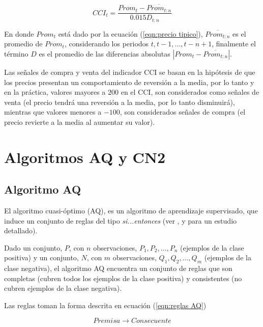 \documentclass[12pt]{scrbook}
\theoremstyle{break}
\theoremstyle{break}
\begin{document}
\begin{equation} \label{eqn:CCI}
CCI_t = \dfrac{ Prom_t - \overline{Prom_{t:n}} }{ 0.015 D_{t:n}}
\end{equation}

En donde $Prom_t$ está dado por la ecuación (\ref{eqn:precio tipico}), $\overline{Prom_{t:n}}$ es el promedio de $Prom_t$, considerando los periodos $t, t-1, \ldots, t-n +1$, finalmente el término $D$ es el promedio de las diferencias absolutas $\left|Prom_t - \overline{Prom_{t:n}}  \right|$.

Las señales de compra y venta del indicador CCI se basan en la hipótesis de que los precios presentan un comportamiento de reversión a la media, por lo tanto y en la práctica, valores mayores a $200$ en el CCI, son considerados como señales de venta (el precio tendrá una reversión a la media, por lo tanto disminuirá), mientras que valores menores a $-100$, son considerados señales de compra (el precio revierte a la media al aumentar su valor).

\section{Algoritmos AQ y CN2}
\label{seccion:algoritmos aq cn2}

\subsection{Algoritmo AQ}
\label{subseccion:algoritmo aq}
El algoritmo cuasi-óptimo (AQ), es un algoritmo de aprendizaje supervisado, que induce un conjunto de reglas del tipo \textit{si...entonces} (ver \cite{AQCervone2010}, \cite{AQMichalski1991} y \cite{AQWojtusiak2012} para un estudio detallado). 

Dado un conjunto, $P$, con $n$ observaciones, $P_1, P_2, \ldots, P_n$ (ejemplos de la clase positiva)  y un conjunto, $N$, con $m$ observaciones, $Q_1, Q_2, \ldots, Q_m$ (ejemplos de la clase negativa), el algoritmo AQ encuentra un conjunto de reglas que son completas (cubren todos los ejemplos de la clase positiva) y consistentes (no cubren ejemplos de la clase negativa).

Las reglas toman la forma descrita en ecuación (\ref{eqn:reglas AQ})

\begin{equation} \label{eqn:reglas AQ}
Premisa \rightarrow Consecuente
\end{equation}
\end{document}
